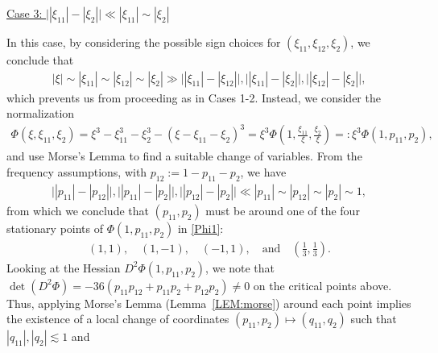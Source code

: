 \documentclass[%
11pt,  reqno]{amsart}
\newcommand{\5}{\textup{V}}
\newcommand{\noi}{\noindent}
\newcommand{\les}{\lesssim}
\theoremstyle{remark}
\newcommand{\ld}{\lambda}
\numberwithin{equation}{section}
\numberwithin{theorem}{section}
\begin{document}
\smallskip

\noi
\underline{Case 3:  $\big| |\xi_{11}| - |\xi_2| \big| \ll |\xi_{11}| \sim |\xi_2|$}

In this case, by considering the possible sign choices for $(\xi_{11}, \xi_{12}, \xi_2)$, we conclude that
\begin{align}
|\xi| \sim |\xi_{11}| \sim |\xi_{12}| \sim |\xi_2| \gg \big| |\xi_{11}| -| \xi_{12}| \big|, \big| |\xi_{11}| -| \xi_{2}| \big|, \big| |\xi_{12}| -| \xi_{2}| \big| ,
\end{align}
which prevents us from proceeding as in Cases 1-2. Instead, we consider the normalization
\begin{align}\label{Phi1}
\Phi(\xi, \xi_{11}, \xi_2) = \xi^3 - \xi_{11}^3 - \xi_2^3 - (\xi - \xi_{11} - \xi_2)^3  = \xi^3 \Phi(1, \tfrac{\xi_{11}}{\xi}, \tfrac{\xi_2}{\xi}) =: \xi^3 \Phi(1, p_{11}, p_2), 
\end{align}
and use Morse's Lemma to find a suitable change of variables.
From the frequency assumptions, with $p_{12}:= 1 - p_{11} - p_2$, we have 
\begin{align}
\big| |p_{11}| - |p_{12}| \big|, 
\big| |p_{11}| - |p_2| \big|,
\big| |p_{12}| - |p_2| \big|
 \ll |p_{11}| \sim |p_{12} | \sim |p_2|  \sim 1, 
\end{align}
from which we conclude that 
$(p_{11}, p_2)$ must be around one of the four stationary points of $\Phi(1, p_{11}, p_2)$ in \eqref{Phi1}:
\begin{align}
(1, 1), 
\quad
(1, -1), 
\quad 
(-1,1), 
\quad 
\text{and}
\quad 
(\tfrac13, \tfrac13). 
\end{align}
Looking at the Hessian $D^2 \Phi(1, p_{11}, p_2)$, we note that $\det (D^2 \Phi) = -36 (p_{11} p_{12} + p_{11} p_2 + p_{12} p_2) \ne0 $ on the critical points above. Thus, applying Morse's Lemma (Lemma~\ref{LEM:morse}) around each point implies the existence of a local change of coordinates $(p_{11},p_2) \mapsto (q_{11}, q_2)$ such that $|q_{11}|, |q_2| \les 1$ and 
\end{document}
